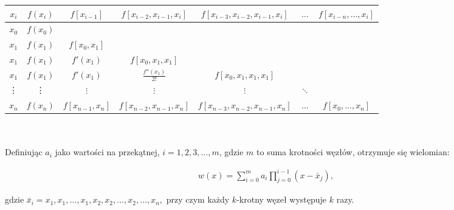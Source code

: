 \documentclass[12pt]{article}
\begin{document}
    \begin{tabular}{|c|c|cccll}
        \hline
        $x_i$ &
        $f(x_i)$ &
        \multicolumn{1}{c|}{$f[x_{i-1}]$} &
        \multicolumn{1}{c|}{$f[x_{i-2},x_{i-1},x_i]$} &
        \multicolumn{1}{c|}{$f[x_{i-3},x_{i-2},x_{i-1},x_i]$} &
        \multicolumn{1}{c|}{$\dots$} &
        \multicolumn{1}{c|}{$f[x_{i-n},\dots,x_i]$} \\ \hline
        $x_0$ &
        $f(x_0)$ &
        &
        &
        \multicolumn{1}{l}{} &
        &
        \\ \cline{1-3}
        $x_1$ &
        $f(x_1)$ &
        \multicolumn{1}{c|}{$f[x_0,x_1]$} &
        &
        \multicolumn{1}{l}{} &
        &
        \\ \cline{1-4}
        $x_1$ &
        $f(x_1)$ &
        \multicolumn{1}{c|}{$f'(x_1)$} &
        \multicolumn{1}{c|}{$f[x_0,x_1,x_1]$} &
        \multicolumn{1}{l}{} &
        &
        \\ \cline{1-5}
        $x_1$ &
        $f(x_1)$ &
        \multicolumn{1}{c|}{$f'(x_1)$} &
        \multicolumn{1}{c|}{$\frac{f''(x_1)}{2!}$} &
        \multicolumn{1}{c|}{$f[x_0,x_1,x_1,x_1]$} &
        &
        \\ \cline{1-6}
        \vdots &
        \vdots &
        \multicolumn{1}{c|}{$\vdots$} &
        \multicolumn{1}{c|}{$\vdots$} &
        \multicolumn{1}{c|}{$\vdots$} &
        \multicolumn{1}{c|}{$\ddots$} &
        \\ \hline
        $x_n$ &
        $f(x_n)$ &
        \multicolumn{1}{c|}{$f[x_{n-1},x_n]$} &
        \multicolumn{1}{c|}{$f[x_{n-2},x_{n-1},x_n]$} &
        \multicolumn{1}{c|}{$f[x_{n-3},x_{n-2},x_{n-1},x_n]$} &
        \multicolumn{1}{c|}{$\dots$} &
        \multicolumn{1}{c|}{$f[x_0,\dots,x_n]$} \\ \hline
    \end{tabular}\\\\

    Definiując $a_{i}$ jako wartości na przekątnej, $i=1,2,3,\dots ,m$, gdzie $m$ to suma krotności węzłów, otrzymuje się wielomian:

    \begin{align*}
        w(x)=\sum _{i=0}^{m}a_{i}\prod _{j=0}^{i-1}(x-{\bar {x}}_{j}),
    \end{align*}

    gdzie ${\bar {x}}_{i}={x_{1},x_{1},\dots ,x_{1},x_{2},x_{2},\dots ,x_{2},\dots ,x_{n}},$ przy czym każdy $k$-krotny węzeł występuje $k$ razy.
\end{document}

